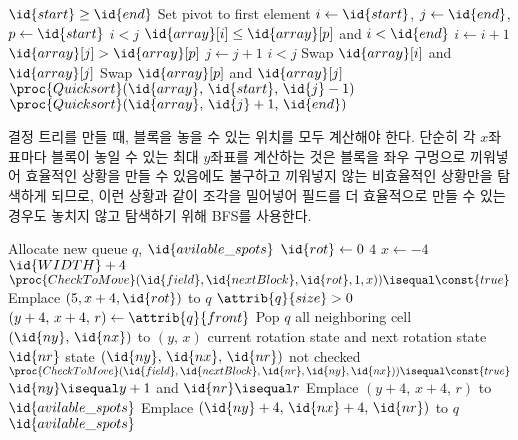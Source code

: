 \begin{codebox}
\li \If $\id{start} \geq \id{end}$ \Then
\li     \Return
    \End
\li \Comment Set pivot to first element
\li $i \gets \id{start}$, $j \gets \id{end}$, $p \gets \id{start}$
\li \While $i < j$ \Do
\li     \While $\id{array}[i] \leq \id{array}[p]$ and $i < \id{end}$ \Do
\li         $i \gets i + 1$
        \End
\li     \While $\id{array}[j] > \id{array}[p]$ \Do
\li         $j \gets j + 1$
        \End
\li     \If $i<j$ \Then
\li         Swap $\id{array}[i]$ and $\id{array}[j]$
        \End
    \End
\li Swap $\id{array}[p]$ and $\id{array}[j]$
\li $\proc{Quicksort}(\id{array},\,\id{start},\,\id{j} - 1)$
\li $\proc{Quicksort}(\id{array},\,\id{j} + 1,\,\id{end})$
\end{codebox}

결정 트리를 만들 때, 블록을 놓을 수 있는 위치를 모두 계산해야 한다. 단순히 각 $x$좌표마다
블록이 놓일 수 있는 최대 $y$좌표를 계산하는 것은 블록을 좌우 구멍으로 끼워넣어 효율적인 상황을 만들 수 있음에도 불구하고 끼워넣지 않는
비효율적인 상황만을 탐색하게 되므로, 이런 상황과 같이 조각을 밀어넣어 필드를 더 효율적으로 만들
수 있는 경우도 놓치지 않고 탐색하기 위해 BFS를 사용한다.

\begin{codebox}
\li Allocate new queue $q$, $\id{avilable\_spots}$
\li \For $\id{rot} \gets 0$ \To $4$ \Do
\li     \For $x \gets -4$ \To $\id{WIDTH} + 4$ \Do
\li         \If $\proc{CheckToMove}(\id{field}, \id{nextBlock}, \id{rot}, 1, x)) \isequal \const{true}$ \Then
\li             Emplace $(5, x + 4, \id{rot})$ to $q$
            \End
        \End
    \End
\li \While $\attrib{q}{size} > 0$ \Do
\li     $(y + 4,\,x + 4,\,r) \gets \attrib{q}{front}$
\li     Pop $q$
\li     \For all neighboring cell $(\id{ny},\,\id{nx})$ to $(y,\,x)$ \Do
\li         \For current rotation state and next rotation state $\id{nr}$ \Do
\li             \If state $(\id{ny},\,\id{nx},\,\id{nr})$ not checked \Do
\li                 \If $\proc{CheckToMove}(\id{field}, \id{nextBlock}, \id{nr}, \id{ny}, \id{nx})) \isequal \const{true}$ \Then
\li                     \If $\id{ny} \isequal y + 1$ and $\id{nr} \isequal r$ \Do
\li                         Emplace $(y + 4,\,x + 4,\,r)$ to $\id{avilable\_spots}$
\li                     \ElseNoIf
\li                         Emplace $(\id{ny} + 4,\,\id{nx} + 4,\,\id{nr})$ to $q$
\li                     \End
                    \End
                \End
            \End
        \End
    \End
\li \Return $\id{avilable\_spots}$
\end{codebox}

